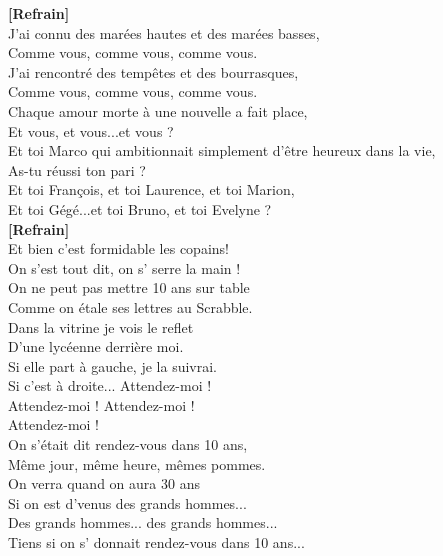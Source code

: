 \documentclass{novel}
\begin{document}
\begin{multicols}{2}
\textbf{[Refrain]} \\

J'ai connu des marées hautes et des marées basses, \\
Comme vous, comme vous, comme vous. \\
J'ai rencontré des tempêtes et des bourrasques, \\
Comme vous, comme vous, comme vous. \\
Chaque amour morte à une nouvelle a fait place, \\
Et vous, et vous...et vous ? \\
Et toi Marco qui ambitionnait simplement d'être heureux dans la vie, \\
As-tu réussi ton pari ? \\
Et toi François, et toi Laurence, et toi Marion, \\
Et toi Gégé...et toi Bruno, et toi Evelyne ? \\

\textbf{[Refrain]} \\

Et bien c'est formidable les copains! \\
On s'est tout dit, on s' serre la main ! \\
On ne peut pas mettre 10 ans sur table \\
Comme on étale ses lettres au Scrabble. \\
Dans la vitrine je vois le reflet \\

D'une lycéenne derrière moi. \\
Si elle part à gauche, je la suivrai. \\
Si c'est à droite... Attendez-moi ! \\
Attendez-moi ! Attendez-moi ! \\
Attendez-moi ! \\

On s'était dit rendez-vous dans 10 ans, \\
Même jour, même heure, mêmes pommes. \\
On verra quand on aura 30 ans \\
Si on est d'venus des grands hommes... \\
Des grands hommes... des grands hommes... \\
Tiens si on s' donnait rendez-vous dans 10 ans... \\

\end{multicols}

\newpage
\footnotesize
\end{document}
